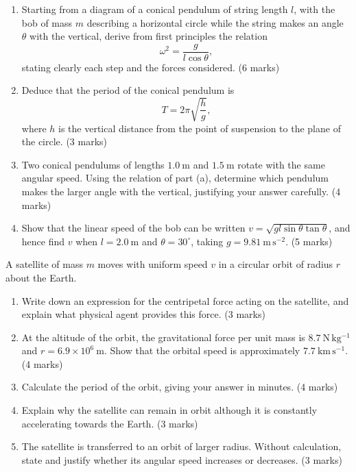 \documentclass[11pt]{article}
\begin{document}
\begin{exercice}
\begin{enumerate}
\item Starting from a diagram of a conical pendulum of string length $l$, with the bob of mass $m$ describing a horizontal circle while the string makes an angle $\theta$ with the vertical, derive from first principles the relation
\[ \omega^{2} = \frac{g}{l\cos\theta}, \]
stating clearly each step and the forces considered. \hfill (6 marks)
\item Deduce that the period of the conical pendulum is
\[ T = 2\pi\sqrt{\frac{h}{g}}, \]
where $h$ is the vertical distance from the point of suspension to the plane of the circle. \hfill (3 marks)
\item Two conical pendulums of lengths $1.0\ \mathrm{m}$ and $1.5\ \mathrm{m}$ rotate with the same angular speed. Using the relation of part (a), determine which pendulum makes the larger angle with the vertical, justifying your answer carefully. \hfill (4 marks)
\item Show that the linear speed of the bob can be written $v = \sqrt{gl\sin\theta\tan\theta}$, and hence find $v$ when $l = 2.0\ \mathrm{m}$ and $\theta = 30^{\circ}$, taking $g = 9.81\ \mathrm{m\,s^{-2}}$. \hfill (5 marks)
\end{enumerate}
\end{exercice}

\begin{exercice}
A satellite of mass $m$ moves with uniform speed $v$ in a circular orbit of radius $r$ about the Earth.
\begin{enumerate}
\item Write down an expression for the centripetal force acting on the satellite, and explain what physical agent provides this force. \hfill (3 marks)
\item At the altitude of the orbit, the gravitational force per unit mass is $8.7\ \mathrm{N\,kg^{-1}}$ and $r = 6.9\times 10^{6}\ \mathrm{m}$. Show that the orbital speed is approximately $7.7\ \mathrm{km\,s^{-1}}$. \hfill (4 marks)
\item Calculate the period of the orbit, giving your answer in minutes. \hfill (4 marks)
\item Explain why the satellite can remain in orbit although it is constantly accelerating towards the Earth. \hfill (3 marks)
\item The satellite is transferred to an orbit of larger radius. Without calculation, state and justify whether its angular speed increases or decreases. \hfill (3 marks)
\end{enumerate}
\end{exercice}
\end{document}

